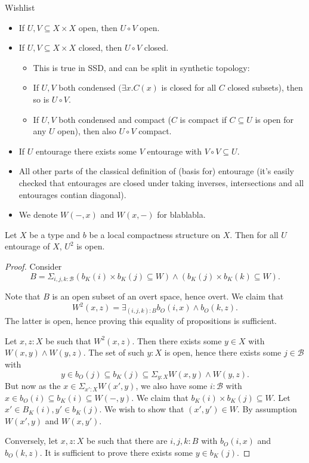 Wishlist
\begin{itemize}
  \item If $U,V\subseteq X\times X$ open, then $U\circ V$ open. 
  \item If $U,V\subseteq X \times X$ closed, then $U \circ V$ closed. 
  \begin{itemize}
      \item This is true in SSD, and can be split in synthetic topology:
      \item If $U,V$ both condensed $(\exists x . C(x)$ is closed for all $C$ closed subsets), then so is $U\circ V$. 
      \item If $U,V$ both condensed and compact ($C$ is compact if $C\subseteq U$ is open for any $U$ open), then also $U\circ V$ compact. 
    \end{itemize}
  \item If $U$ entourage there exists some $V$ entourage with $V\circ V \subseteq U$. 
  \item All other parts of the classical definition of (basis for) entourage (it's easily checked that entourages are closed under taking inverses, intersections and all entourages contian diagonal). 
  \item We denote $W(-,x)$ and $W(x,-)$ for blablabla.
\end{itemize}

\begin{lemma}
  Let $X$ be a type and $b$ be a local compactness structure on $X$. 
  Then for all $U$ entourage of $X$, $U^2$ is open. 
\end{lemma}
\begin{proof}
  Consider
  $$
  B = \Sigma_{i,j,k:\mathcal B} 
  (b_K(i) \times b_K(j) \subseteq W) \wedge (b_K(j) \times b_K(k) \subseteq W).
  $$

  Note that $B$ is an open subset of an overt space, hence overt. 
  We claim that
  $$
  W^2(x,z) = \exists_{(i,j,k):B} b_O(i,x) \wedge b_O(k,z).
  $$
  The latter is open, hence proving this equality of propositions is sufficient. 

  Let $x,z:X$ be such that $W^2(x,z)$. 
  Then there exists some $y\in X$ with $W(x,y) \wedge W(y,z)$. 
  The set of such $y:X$ is open, hence there exists some $j\in \mathcal B$ with 
  $$y \in b_O(j) \subseteq b_K(j) \subseteq \Sigma_{y:X} W(x,y) \wedge W(y,z).$$
  But now as the $x\in \Sigma_{x':X}W(x',y)$, we also have some $i:\mathcal B$ with 
  $x\in b_O(i)\subseteq b_K(i)\subseteq W(-,y)$. 
  We claim that $b_K(i) \times b_K(j) \subseteq W$. 
  Let $x'\in B_K(i), y' \in b_K(j)$. We wish to show that $(x',y') \in W$. 
  By assumption $W(x',y)$ and $W(x,y')$. 

  Conversely, let $x,z:X$ be such that there are $i,j,k:B$ with $b_O(i,x)$ and $b_O(k,z)$. 
  It is sufficient to prove there exists some $y \in b_K(j)$. 

  

\end{proof}

